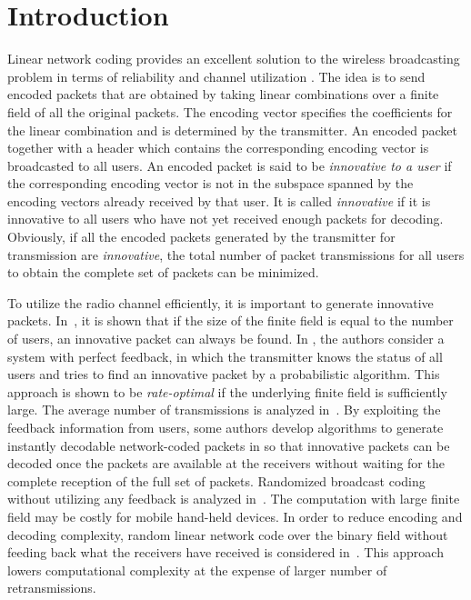 \documentclass[letterpaper,conference,10pt]{IEEEtran}
\begin{document}
\section{Introduction}
Linear network coding provides an excellent solution to the wireless broadcasting problem in terms of reliability and channel utilization \cite{LNC1,LNC2}. The idea is to send encoded packets that are obtained by taking linear combinations over a finite field of all the original packets. The encoding vector specifies the coefficients for the linear combination and is determined by the transmitter. An encoded packet together with a header which contains the corresponding encoding vector is broadcasted to all users. An encoded packet is said to be {\em innovative to a user} if the corresponding encoding vector is not in the subspace spanned by the encoding vectors already received by that user. It is called {\em innovative} if it is innovative to all users who have not yet received enough packets for decoding. Obviously, if all the encoded packets generated by the transmitter for transmission are {\em innovative}, the total number of packet transmissions for all users to obtain the complete set of packets can be minimized.

To utilize the radio channel efficiently, it is important to generate innovative packets. In~\cite{DFT07}, it is shown that if the size of the finite field is equal to the number of users, an innovative packet can always be found. In \cite{KDF08}, the authors consider a system with perfect feedback, in which the transmitter knows the status of all users and tries to find an innovative packet by a probabilistic algorithm. This approach is shown to be {\em rate-optimal} if the underlying finite field is sufficiently large. The average number of transmissions is analyzed in~\cite{XYWZ08}. By exploiting the feedback information from users, some authors develop algorithms to generate instantly decodable network-coded packets in \cite{ID1, ID2} so that innovative packets can be decoded once the packets are available at the receivers without waiting for the complete reception of the full set of packets. Randomized broadcast coding without utilizing any feedback is analyzed in~\cite{EOM06}. The computation with large finite field may be costly for mobile hand-held devices. In order to reduce encoding and decoding complexity, random linear network code over the binary field without feeding back what the receivers have received is considered in~\cite{GTK08,HPFL09}. This approach lowers computational complexity at the expense of larger number of retransmissions.
\end{document}
